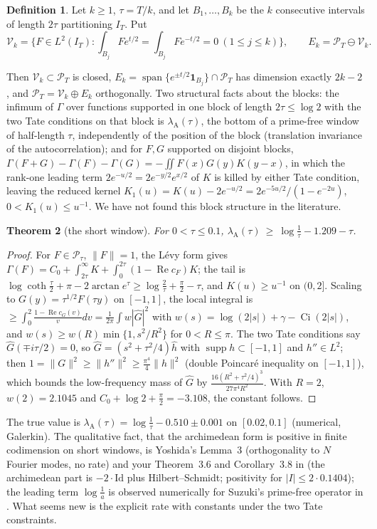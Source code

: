 \documentclass[11pt]{amsart}
\newtheorem{theorem}{Theorem}[section]
\theoremstyle{definition}
\newtheorem{definition}[theorem]{Definition}
\theoremstyle{remark}
\newcommand{\Rel}{\operatorname{Re}}
\newcommand{\supp}{\operatorname{supp}}
\newcommand{\IT}{I_T}
\newcommand{\PT}{\mathcal P_T}
\newcommand{\cF}{c_F}
\newcommand{\lamA}{\lambda_{\mathrm A}}
\begin{document}
\begin{definition}
Let $k\ge1$, $\tau=T/k$, and let $B_1,\dots,B_k$ be the $k$ consecutive intervals of length $2\tau$ partitioning $\IT$. Put
\[
\mathcal V_k=\Big\{F\in L^2(\IT):\int_{B_j}Fe^{t/2}=\int_{B_j}Fe^{-t/2}=0\ (1\le j\le k)\Big\},\qquad E_k=\PT\ominus\mathcal V_k .
\]
\end{definition}
Then $\mathcal V_k\subset\PT$ is closed, $E_k=\operatorname{span}\{e^{\pm t/2}\mathbf 1_{B_j}\}\cap\PT$ has dimension exactly
$2k-2$, and $\PT=\mathcal V_k\oplus E_k$ orthogonally. Two structural facts about the blocks: the infimum of $\Gamma$ over
functions supported in one block of length $2\tau\le\log2$ with the two Tate conditions on that block is $\lamA(\tau)$, the bottom
of a prime-free window of half-length $\tau$, independently of the position of the block (translation invariance of the
autocorrelation); and for $F,G$ supported on disjoint blocks, $\Gamma(F+G)-\Gamma(F)-\Gamma(G)=-\iint F(x)G(y)K(y-x)$, in which
the rank-one leading term $2e^{-u/2}=2e^{-y/2}e^{x/2}$ of $K$ is killed by either Tate condition, leaving the reduced kernel
$K_1(u)=K(u)-2e^{-u/2}=2e^{-5u/2}/(1-e^{-2u})$, $0<K_1(u)\le u^{-1}$. We have not found this block structure in the literature.

\begin{theorem}[the short window]\label{thm:A}
For $0<\tau\le0.1$, $\lamA(\tau)\ \ge\ \log\frac1\tau-1.209-\tau$.
\end{theorem}
\begin{proof}
For $F\in\mathcal P_\tau$, $\|F\|=1$, the L\'evy form gives $\Gamma(F)=C_0+\int_{2\tau}^\infty K+\int_0^{2\tau}(1-\Rel\cF)K$; the tail is
$\log\coth\frac\tau2+\pi-2\arctan e^\tau\ge\log\frac2\tau+\frac\pi2-\tau$, and $K(u)\ge u^{-1}$ on $(0,2]$. Scaling to
$G(y)=\tau^{1/2}F(\tau y)$ on $[-1,1]$, the local integral is $\ge\int_0^2\frac{1-\Rel c_G(v)}vdv=\frac1{2\pi}\int w|\widehat G|^2$ with
$w(s)=\log(2|s|)+\gamma-\operatorname{Ci}(2|s|)$, and $w(s)\ge w(R)\min\{1,s^2/R^2\}$ for $0<R\le\pi$. The two Tate conditions say
$\widehat G(\mp i\tau/2)=0$, so $\widehat G=(s^2+\tau^2/4)\widehat h$ with $\supp h\subset[-1,1]$ and $h''\in L^2$; then
$1=\|G\|^2\ge\|h''\|^2\ge\frac{\pi^4}4\|h\|^2$ (double Poincar\'e inequality on $[-1,1]$), which bounds the low-frequency mass of
$\widehat G$ by $\frac{16(R^2+\tau^2/4)^3}{27\pi^4R^2}$. With $R=2$, $w(2)=2.1045$ and $C_0+\log2+\frac\pi2=-3.108$, the
constant follows.
\end{proof}
The true value is $\lamA(\tau)=\log\frac1\tau-0.510\pm0.001$ on $[0.02,0.1]$ (numerical, Galerkin). The qualitative fact, that
the archimedean form is positive in finite codimension on short windows, is Yoshida's Lemma~3 \cite{Yoshida1992}
(orthogonality to $N$ Fourier modes, no rate) and your Theorem~3.6 and Corollary~3.8 in \cite{CC2021} (the archimedean part is
$-2\cdot\mathrm{Id}$ plus Hilbert--Schmidt; positivity for $|I|\le2\cdot0.1404$); the leading term $\log\frac1a$ is observed
numerically for Suzuki's prime-free operator in \cite{Kim2026}. What seems new is the explicit rate with constants under
the two Tate constraints.
\end{document}

